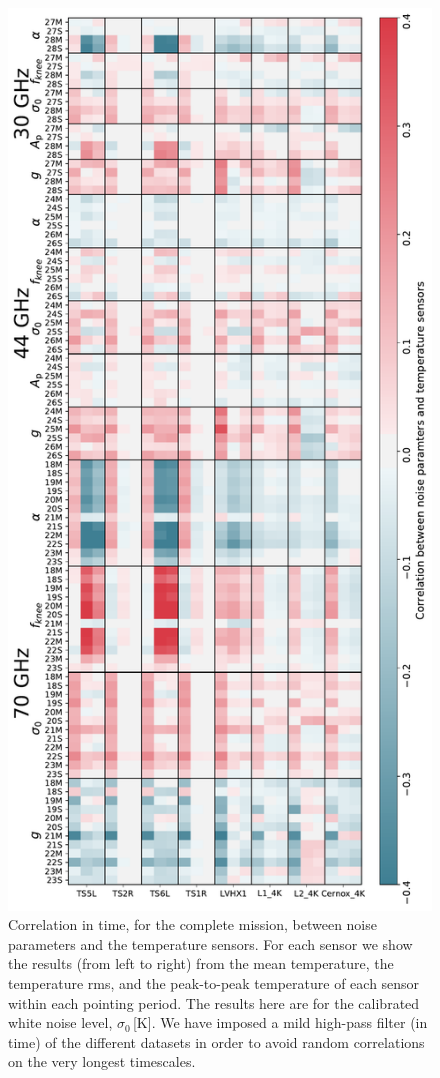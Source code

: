 \documentclass{aa}
\begin{document}
\begin{figure}
        \begin{center}
                \includegraphics[width=\linewidth]{figs/corr_hk_new.pdf}
        \end{center}
        \caption{Correlation in time, for the complete mission, between noise parameters and the temperature sensors. For each sensor we show the results (from left to right) from the mean temperature, the temperature rms, and the peak-to-peak temperature of each sensor within each pointing period. The results here are for the calibrated white noise level, $\sigma_0$\,[K]. We have imposed a mild high-pass filter (in time) of the different datasets in order to avoid random correlations on the very longest timescales.
                \label{fig:hk_corr}}
\end{figure}
\end{document}
